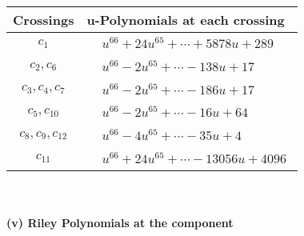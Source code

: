 \documentclass[1p]{elsarticle_modified}
\theoremstyle{definition}
\begin{document}
\begin{tabular}{m{50pt}|m{274pt}}
Crossings & \hspace{64pt}u-Polynomials at each crossing \\
\hline $$\begin{aligned}c_{1}\end{aligned}$$&$\begin{aligned}
&u^{66}+24 u^{65}+\cdots+5878 u+289
\end{aligned}$\\
\hline $$\begin{aligned}c_{2},c_{6}\end{aligned}$$&$\begin{aligned}
&u^{66}-2 u^{65}+\cdots-138 u+17
\end{aligned}$\\
\hline $$\begin{aligned}c_{3},c_{4},c_{7}\end{aligned}$$&$\begin{aligned}
&u^{66}-2 u^{65}+\cdots-186 u+17
\end{aligned}$\\
\hline $$\begin{aligned}c_{5},c_{10}\end{aligned}$$&$\begin{aligned}
&u^{66}-2 u^{65}+\cdots-16 u+64
\end{aligned}$\\
\hline $$\begin{aligned}c_{8},c_{9},c_{12}\end{aligned}$$&$\begin{aligned}
&u^{66}-4 u^{65}+\cdots-35 u+4
\end{aligned}$\\
\hline $$\begin{aligned}c_{11}\end{aligned}$$&$\begin{aligned}
&u^{66}+24 u^{65}+\cdots-13056 u+4096
\end{aligned}$\\
\hline
\end{tabular}\\~\\
\newpage\renewcommand{\arraystretch}{1}
\flushleft \textbf{(v) Riley Polynomials at the component}\newline \\
\end{document}
